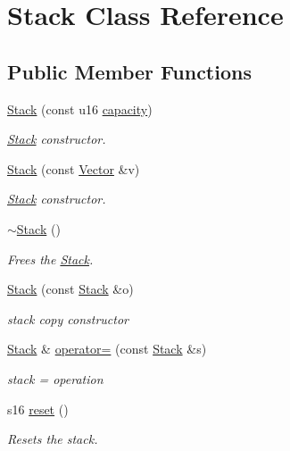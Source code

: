 \hypertarget{class_stack}{}\section{Stack Class Reference}
\label{class_stack}
\subsection*{Public Member Functions}
\begin{DoxyCompactItemize}
\item 
\hyperlink{class_stack_ae208bce3b329f0dc82c8b7e761bb595e}{Stack} (const u16 \hyperlink{class_stack_a3bb579836ffee2ddc1eb7cb0bfa02b43}{capacity})
\begin{DoxyCompactList}\small\item\em \hyperlink{class_stack}{Stack} constructor. \end{DoxyCompactList}\item 
\hyperlink{class_stack_ae06d731c1b3802e21c211d8118945667}{Stack} (const \hyperlink{class_vector}{Vector} \&v)
\begin{DoxyCompactList}\small\item\em \hyperlink{class_stack}{Stack} constructor. \end{DoxyCompactList}\item 
\hyperlink{class_stack_a40bd5dff912f0e5290777c4b46d17809}{$\sim$\+Stack} ()
\begin{DoxyCompactList}\small\item\em Frees the \hyperlink{class_stack}{Stack}. \end{DoxyCompactList}\item 
\hyperlink{class_stack_a44d3a06cb431d4e657197d01e10414f8}{Stack} (const \hyperlink{class_stack}{Stack} \&o)
\begin{DoxyCompactList}\small\item\em stack copy constructor \end{DoxyCompactList}\item 
\hyperlink{class_stack}{Stack} \& \hyperlink{class_stack_a673ed59047b6764946b7db209fef7dab}{operator=} (const \hyperlink{class_stack}{Stack} \&s)
\begin{DoxyCompactList}\small\item\em stack = operation \end{DoxyCompactList}\item 
s16 \hyperlink{class_stack_a2f7b55c0ee432748d78175f3d830ce27}{reset} ()
\begin{DoxyCompactList}\small\item\em Resets the stack. \end{DoxyCompactList}\item 

\end{DoxyCompactItemize}
